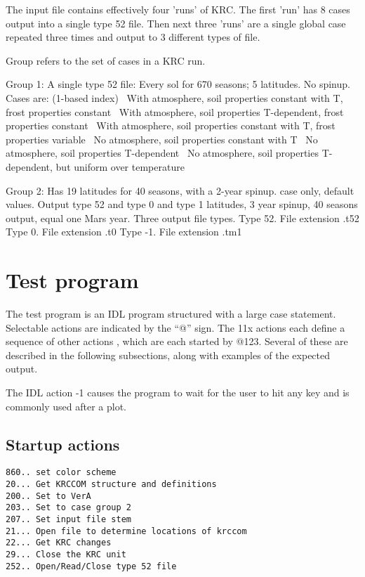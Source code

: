 \documentclass{article}  %
\begin{document}
The input file  contains effectively four 'runs' of KRC. The first 'run' has 8 cases output into a single type 52 file. Then next three 'runs' are a single global case repeated three times and output to 3 different types of file.

Group refers to the set of cases in a KRC run. 


Group 1: A single type 52 file:  Every sol for 670 seasons; 5 latitudes. No spinup. Cases are: (1-based index)
 \ With atmosphere, soil properties constant with T, frost properties constant
 \ With atmosphere, soil properties T-dependent, frost properties constant
 \ With atmosphere, soil properties constant with T, frost properties variable
 \ No atmosphere, soil properties constant with T
 \ No atmosphere, soil properties T-dependent
 \ No atmosphere, soil properties T-dependent, but uniform over temperature

Group 2:  Has 19 latitudes for 40 seasons, with a 2-year spinup.
 case only, default values.  Output type 52 and type 0 and type 1
 latitudes, 3 year spinup, 40 seasons output, equal one Mars year.
\qi Three output file types.
\qii Type 52.  File extension .t52
\qii Type 0. File extension .t0
\qii Type -1. File extension .tm1
 
\section{Test program} %

The test program is an IDL program structured with a large case
statement. Selectable actions are indicated by the ``@'' sign. The 11x actions
each define a sequence of other actions , which are each started by
@123. Several of these are described in the following subsections, along with examples of the expected output.

The IDL action -1 causes the program to wait for the user to hit any key and is commonly used after a plot.

\subsection{Startup actions}
\vspace{-3.mm} 
\begin{verbatim}
860.. set color scheme
20... Get KRCCOM structure and definitions
200.. Set to VerA 
203.. Set to case group 2
207.. Set input file stem
21... Open file to determine locations of krccom
22... Get KRC changes
29... Close the KRC unit
252.. Open/Read/Close type 52 file
\end{verbatim}
\end{document}
